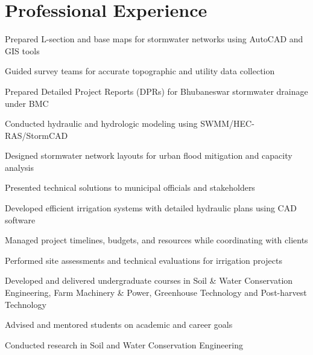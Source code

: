 \documentclass[]{deedy-resume-openfont}
\begin{document}
\begin{minipage}[t]{0.66\textwidth}


\section{Professional Experience}

\begin{tightemize}
\item Prepared L-section and base maps for stormwater networks using AutoCAD and GIS tools
\item Guided survey teams for accurate topographic and utility data collection
\item Prepared Detailed Project Reports (DPRs) for Bhubaneswar stormwater drainage under BMC
\item Conducted hydraulic and hydrologic modeling using SWMM/HEC-RAS/StormCAD
\item Designed stormwater network layouts for urban flood mitigation and capacity analysis
\item Presented technical solutions to municipal officials and stakeholders
\end{tightemize}
\sectionsep

\begin{tightemize}
\item Developed efficient irrigation systems with detailed hydraulic plans using CAD software
\item Managed project timelines, budgets, and resources while coordinating with clients
\item Performed site assessments and technical evaluations for irrigation projects
\end{tightemize}
\sectionsep

\begin{tightemize}
\item Developed and delivered undergraduate courses in Soil \& Water Conservation Engineering, Farm Machinery \& Power, Greenhouse Technology and Post-harvest Technology
\item Advised and mentored students on academic and career goals
\item Conducted research in Soil and Water Conservation Engineering
\end{tightemize}
\sectionsep


\end{minipage}
\end{document}
